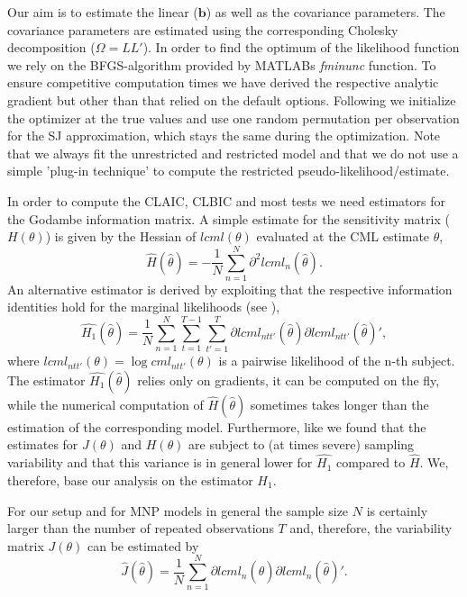 \documentclass[12pt, a4paper]{article}
\numberwithin{defcounter}{section}
\numberwithin{excounter}{section}
\begin{document}
Our aim is to estimate the linear ($\textbf{b}$) as well as the covariance 
parameters. The covariance parameters are estimated using the corresponding Cholesky decomposition ($\Omega = LL'$). In order to find the optimum of the likelihood function we rely on the BFGS-algorithm provided by MATLABs \textit{fminunc} function. To ensure competitive computation times we have derived the respective analytic gradient but other than that relied on the default options. Following \citep{bhat2011a} we initialize the optimizer at the true values and use one random permutation per observation for the \ac{SJ} approximation, which stays the same during the optimization. Note that we always fit the unrestricted and restricted model and that we do not use a simple 'plug-in technique' to compute the restricted pseudo-likelihood/estimate.

In order to compute the \ac{CLAIC}, \ac{CLBIC} and most tests we need estimators for the Godambe information matrix. A simple estimate for the sensitivity matrix ($H(\theta)$) is given by the Hessian of $lcml(\theta)$ evaluated at the \ac{CML} estimate $\hat{\theta}$,
\begin{equation*}
\hat{H}(\hat\theta) = - \frac{1}{N} \sum_{n=1}^N \partial^2 lcml_n(\hat{\theta}).
\end{equation*}
An alternative estimator is derived by exploiting that the respective information identities hold for the marginal likelihoods (see \cite{lindsay2011}), 
\begin{equation*}
\hat{H_1}(\hat\theta) = \frac{1}{N} \sum_{n=1}^N  \sum_{t=1}^{T-1} \sum_{t'=1}^T  \partial lcml_{ntt'}(\hat{\theta}) \partial lcml_{ntt'}(\hat{\theta})',
\end{equation*}
where $lcml_{ntt'}(\theta) = \log cml_{ntt'}(\theta)$ is a pairwise likelihood of the n-th subject. 
\\
The estimator $\hat{H_1}(\hat\theta)$ relies only on gradients, it can be computed on the fly, while the numerical computation of $\hat{H}(\hat\theta)$ sometimes takes longer than the estimation of the corresponding model. Furthermore, like \cite[43f]{claeskens2008} we found that the estimates for $J(\theta)$ and $H(\theta)$ are subject to (at times severe) sampling variability and that this variance is in general lower for $\hat{H_1}$ compared to $\hat{H}$. We, therefore, base our analysis on the estimator $\hat{H_1}$.

For our setup and for \ac{MNP} models in general the sample size $N$ is certainly larger than the number of repeated observations $T$ and, therefore, the variability matrix $J(\theta)$ can be estimated by 
\begin{equation*}
\hat{J}(\hat\theta) = \frac{1}{N} \sum_{n=1}^N \partial lcml_n (\hat{\theta}) \partial lcml_n (\hat{\theta})'. 
\end{equation*}
\end{document}
